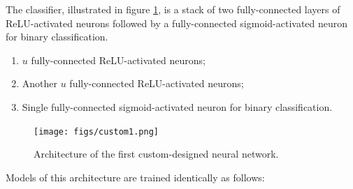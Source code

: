 The classifier, illustrated in figure \ref{fig:custom1}, is a stack of two fully-connected layers of ReLU-activated neurons followed by a fully-connected sigmoid-activated neuron for binary classification.

\begin{enumerate}
    \item $u$ fully-connected ReLU-activated neurons;
    \item Another $u$ fully-connected ReLU-activated neurons;
    \item Single fully-connected sigmoid-activated neuron for binary classification.
\end{enumerate}

\begin{figure}[ht]
    \centering
    \texttt{[image: figs/custom1.png]}
    \caption{Architecture of the first custom-designed neural network.}
    \label{fig:custom1}
\end{figure}

Models of this architecture are trained identically as follows:

